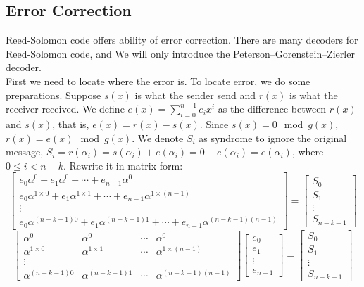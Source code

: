 \documentclass[12pt]{article}
\begin{document}
\subsection{Error Correction}
Reed-Solomon code offers ability of error correction. There are many decoders for Reed-Solomon code, and We will only introduce the Peterson–Gorenstein–Zierler decoder.\cite{gorenstein1961class}\\
First we need to locate where the error is. To locate error, we do some preparations. Suppose $s(x)$ is what the sender send and $r(x)$ is what the receiver received. We define $e(x) = \sum_{i=0}^{n-1} e_{i}x^{i}$ as the difference between $r(x)$ and $s(x)$, that is, $e(x) = r(x) - s(x)$. Since $s(x) = 0\mod g(x)$, $r(x) = e(x)\mod g(x)$. We denote $S_i$ as syndrome to ignore the original message, $S_i = r(\alpha_i) = s(\alpha_i) + e(\alpha_i) = 0 + e(\alpha_i) = e(\alpha_i)$, where $0 \leq i < n - k$. Rewrite it in matrix form:
\[ 		
\begin{bmatrix} 		
e_0 \alpha^{0} + e_1 \alpha^{0} + \cdots + e_{n-1} \alpha^{0} \\ 		
e_0 \alpha^{1 \times 0} + e_1 \alpha^{1 \times 1} + \cdots + e_{n-1} \alpha^{1 \times (n-1)} \\ 		
\vdots \\ 		
e_0 \alpha^{(n-k-1)0} + e_1 \alpha^{(n-k-1)1} + \cdots + e_{n-1} \alpha^{(n-k-1)(n-1)} 		
\end{bmatrix} 		
= 
\begin{bmatrix} 		
S_0 \\ 
S_1 \\ 
\vdots \\ 
S_{n-k-1} 		
\end{bmatrix} 		
\]
\[ 		
\begin{bmatrix} 		
\alpha^{0} & \alpha^{0} & \cdots & \alpha^{0} \\ 	
\alpha^{1 \times 0} & \alpha^{1 \times 1} & \cdots & \alpha^{1 \times (n-1)} \\ 		
\vdots \\ 		
\alpha^{(n-k-1)0} & \alpha^{(n-k-1)1} & \cdots & \alpha^{(n-k-1)(n-1)} 		
\end{bmatrix} 		
\begin{bmatrix} 		
e_0 \\ 
e_1 \\ 
\vdots \\ 
e_{n-1} 		
\end{bmatrix} 		
= 
\begin{bmatrix} 		
S_0 \\ 
S_1 \\ 
\vdots \\ 
S_{n-k-1} 		
\end{bmatrix} 		
\]
\end{document}
